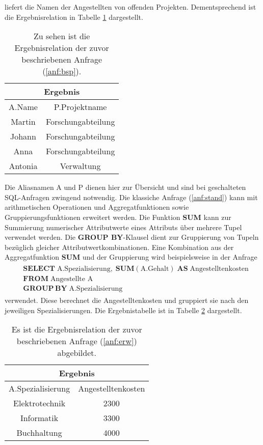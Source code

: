 liefert die Namen der Angestellten von offenden Projekten. Dementsprechend ist die Ergebnisrelation in Tabelle \ref{abb:result_relation} dargestellt.
\begin{table}[h]
    \centering
\begin{tabular}{|c|c|} \hline
    \multicolumn{2}{|c|}{\textbf{Ergebnis}} \\ \hline
    \hline
    A.Name & P.Projektname \\ 
    \hline
    Martin &Forschungabteilung \\ 
    \hline
    Johann &Forschungabteilung\\
    \hline
    Anna &Forschungabteilung\\ 
    \hline
    Antonia &Verwaltung \\
    \hline
\end{tabular}
\caption[]{Zu sehen ist die Ergebnisrelation der zuvor beschriebenen Anfrage (\ref{anf:bsp}).}
\label{abb:result_relation}
\end{table}
Die Aliasnamen \glqq A\grqq{} und \glqq P\grqq{} dienen hier zur Übersicht und sind bei geschalteten SQL-Anfragen zwingend notwendig. Die klassiche Anfrage (\ref{anf:stand}) kann mit arithmetischen Operationen und Aggregatfunktionen sowie Gruppierungsfunktionen erweitert werden. Die Funktion \textbf{SUM} kann zur Summierung numerischer Attributwerte eines Attributs über mehrere Tupel verwendet werden. Die \textbf{GROUP BY}-Klausel dient zur Gruppierung von Tupeln bezüglich gleicher Attributwertkombinationen. Eine Kombination aus der Aggregatfunktion \textbf{SUM} und der Gruppierung wird beispielsweise in der Anfrage
\begin{align}
    \label{anf:erw}
    \begin{split}
        & \mathbf{SELECT} \; \text{A.Spezialisierung}, \; \mathbf{SUM}(\text{A.Gehalt}) \; \mathbf{AS} \; \text{Angestelltenkosten}\\
        & \mathbf{FROM} \; \text{Angestellte A} \\
        &\mathbf{GROUP} \, \mathbf{BY} \; \text{A.Spezialisierung}
    \end{split}
\end{align}
verwendet. Diese berechnet die Angestelltenkosten und gruppiert sie nach den jeweiligen Spezialisierungen. Die Ergebnistabelle ist in Tabelle \ref{abb:erg_erw} dargestellt.
\begin{table}[h]
    \centering
\begin{tabular}{|c|c|} \hline
    \multicolumn{2}{|c|}{\textbf{Ergebnis}} \\ \hline
    \hline
    A.Spezialisierung &Angestelltenkosten\\ 
    \hline
    Elektrotechnik &2300 \\ 
    \hline
    Informatik &3300\\
    \hline
    Buchhaltung &4000\\ 
    \hline
\end{tabular}
\caption[]{Es ist die Ergebnisrelation der zuvor beschriebenen Anfrage (\ref{anf:erw})
\label{abb:erg_erw} abgebildet.}
\end{table}
